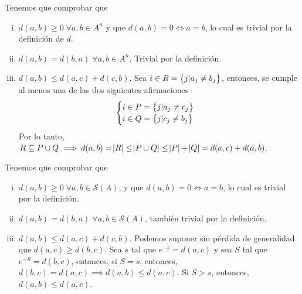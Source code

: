 \begin{eje}
    Tenemos que comprobar que
    \begin{enumerate}[i)]
        \item $d(a,b) \geq 0 \; \forall a,b \in A^n$ y que $d(a,b) = 0 \iff a = b$, lo cual es trivial por la definición de $d$.
        \item $d(a,b) = d(b,a) \; \forall a,b \in A^n$. Trivial por la definición.
        \item $d(a, b) \leq d(a,c) + d(c, b)$. Sea $i \in R = \left\{j \vert a_j \neq b_j\right\}$, entonces, se cumple al menos una de las dos siguientes afirmaciones
            \[
                \begin{cases}
                    i \in P = \left\{j \vert a_j \neq c_j\right\} \\
                    i \in Q = \left\{j \vert c_j \neq b_j\right\}
                \end{cases}
            \]
            Por lo tanto, $R \subseteq P \cup Q \implies d(a,b) = \abs{R} \leq \abs{P \cup Q} \leq \abs{P} + \abs{Q} = d(a,c) + d(a,b)$.
    \end{enumerate}
\end{eje}

\begin{eje}
    Tenemos que comprobar que
    \begin{enumerate}[i)]
        \item $d(a,b) \geq 0 \;  \forall a,b \in \mathcal{S}(A)$, y que $d(a,b) = 0 \iff a = b$, lo cual es trivial por la definición.
        \item $d(a,b) = d(b,a) \; \forall a,b \in \mathcal{S}(A)$, tambi\'en trivial por la definición.
        \item $d(a,b) \leq d(a,c) + d(c,b)$. Podemos suponer sin p\'erdida de generalidad que $d(a,c) \geq d(b,c)$. Sea $s$ tal que $e^{-s} = d(a,c)$ y sea
            $S$ tal que $e^{-S} = d(b,c)$, entonces, si $S = s$, entonces, $d(b, c) = d(a,c) \implies d(a, b) \leq d(a,c)$. Si $S > s$, entonces, 
            $d(a, b) \leq d(a,c)$.
    \end{enumerate}
\end{eje}

